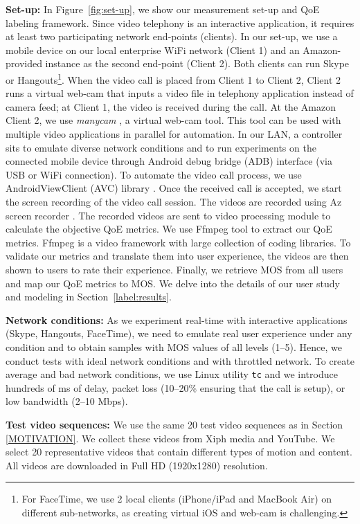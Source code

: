 \noindent \textbf{Set-up:} 
In Figure~\ref{fig:set-up}, we show our measurement set-up and QoE labeling framework. 
Since video telephony is an interactive application, it requires at least two participating network end-points (clients). In our set-up, we use a mobile device on our local enterprise WiFi network (Client 1) and an Amazon-provided instance as the second end-point (Client 2). Both clients can run Skype or Hangouts\footnote{For FaceTime, we use 2 local clients (iPhone/iPad and MacBook Air) on different sub-networks, as creating virtual iOS and web-cam is challenging.}. 
When the video call is placed from Client 1 to Client 2, Client 2 runs a virtual web-cam that inputs a video file in telephony application instead of camera feed; at Client 1, the video is received during the call.
At the Amazon Client 2, we use \textit{manycam} \cite{mancam}, a virtual web-cam tool. 
This tool can be used with multiple video applications in parallel for automation. 
In our LAN, a controller sits  to emulate diverse network conditions and to run experiments on the connected mobile device  through Android debug bridge (ADB) interface (via USB or WiFi connection). 
To automate the video call process, we use AndroidViewClient (AVC) library \cite{awc}.
Once the received call is accepted, we start the screen recording of the video call session.   The videos are recorded using Az screen recorder \cite{azscreen}. 
The recorded videos are sent to video processing module to calculate the objective QoE metrics. 
We use Ffmpeg \cite{ffmpeg} tool to extract our QoE metrics. Ffmpeg is a video framework with large collection of coding libraries. To validate our metrics and translate them into user experience, the videos are then shown to users to rate their experience. 
Finally, we retrieve MOS from all users and map our QoE metrics to MOS. We delve into the details of our user  study and modeling in Section~\ref{label:results}.

\noindent \textbf{Network conditions:} As we experiment real-time with interactive applications (Skype, Hangouts, FaceTime), we need to emulate real user experience under any condition and to obtain samples with MOS values of all levels (1--5). Hence, we conduct tests with ideal network conditions and with throttled network. To create average and bad network conditions, we use Linux utility \texttt{tc} and we introduce hundreds of ms of delay, packet loss (10--20\% ensuring that the call is setup), or low bandwidth (2--10 Mbps).  

\noindent \textbf{Test video sequences:} We use the same 20 test video sequences as in Section \ref{MOTIVATION}. 
We collect these videos  from Xiph media \cite{xiph2008org} and YouTube. We select 20 representative videos that contain different types of motion and content.
All videos are downloaded in Full HD (1920x1280) resolution.

